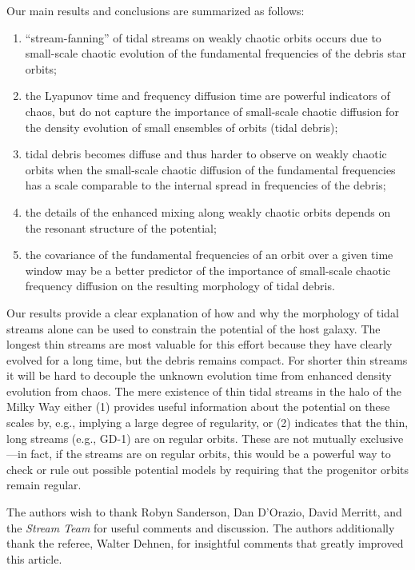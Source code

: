 \documentclass{mn2e}
\newcommand{\chchchanges}[1]{#1}
\begin{document}
Our main results and conclusions are summarized as follows:
\begin{enumerate}
	\item ``stream-fanning'' of tidal streams on weakly chaotic orbits \citep[as seen in simulations by][]{pearson15} occurs due to small-scale chaotic evolution of the fundamental frequencies of the debris star orbits;
	\item the Lyapunov time and frequency diffusion time are powerful indicators of chaos, but do not capture the importance of small-scale chaotic diffusion for the density evolution of small ensembles of orbits (tidal debris);
	\item tidal debris becomes diffuse and thus harder to observe on weakly chaotic orbits when the small-scale chaotic diffusion of the fundamental frequencies has a scale comparable to the internal spread in frequencies of the debris;
	\item the details of the enhanced mixing along weakly chaotic orbits depends on the resonant structure of the potential;
	\item the covariance of the fundamental frequencies of an orbit over a given time window may be a better predictor of the importance of small-scale chaotic frequency diffusion on the resulting morphology of tidal debris.
\end{enumerate}

Our results provide a clear explanation of how and why the morphology of tidal streams alone can be used to constrain the potential of the host galaxy. The longest thin streams are most valuable for this effort because they have clearly evolved for a long time, but the debris remains compact. For shorter thin streams it will be hard to decouple the unknown evolution time from enhanced density evolution from chaos. The mere existence of thin tidal streams in the halo of the Milky Way either (1) provides useful information about the potential on these scales by, e.g., implying a large degree of regularity, or (2) indicates that the thin, long streams (e.g., GD-1) are on regular orbits. These are not mutually exclusive---in fact, if the streams are on regular orbits, this would be a powerful way to check or rule out possible potential models by requiring that the progenitor orbits remain regular.

\acknowledgements
The authors wish to thank Robyn Sanderson, Dan D'Orazio, David Merritt, and the \emph{Stream Team} for useful comments and discussion. \chchchanges{The authors additionally thank the referee, Walter Dehnen, for insightful comments that greatly improved this article.}
\end{document}
